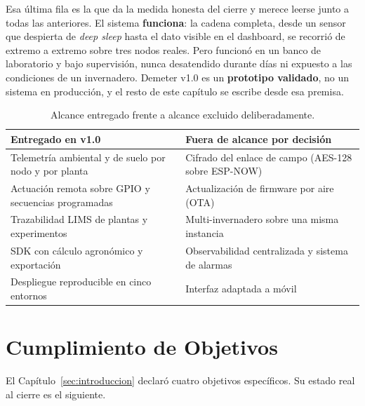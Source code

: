 Esa última fila es la que da la medida honesta del cierre y merece leerse junto a
todas las anteriores. El sistema \textbf{funciona}: la cadena completa, desde un
sensor que despierta de \textit{deep sleep} hasta el dato visible en el dashboard,
se recorrió de extremo a extremo sobre tres nodos reales. Pero funcionó en un banco
de laboratorio y bajo supervisión, nunca desatendido durante días ni expuesto a las
condiciones de un invernadero. Demeter v1.0 es un \textbf{prototipo validado}, no un
sistema en producción, y el resto de este capítulo se escribe desde esa premisa.

\begin{table}[H]
    \centering
    \caption{Alcance entregado frente a alcance excluido deliberadamente.}
    \label{tab:alcance_v1}
    \begin{tabular}{p{6.2cm}p{6.2cm}}
        \toprule
        \textbf{Entregado en v1.0} & \textbf{Fuera de alcance por decisión} \\
        \midrule
        Telemetría ambiental y de suelo por nodo y por planta &
        Cifrado del enlace de campo (AES-128 sobre ESP-NOW) \\
        Actuación remota sobre GPIO y secuencias programadas &
        Actualización de firmware por aire (OTA) \\
        Trazabilidad LIMS de plantas y experimentos &
        Multi-invernadero sobre una misma instancia \\
        SDK con cálculo agronómico y exportación &
        Observabilidad centralizada y sistema de alarmas \\
        Despliegue reproducible en cinco entornos &
        Interfaz adaptada a móvil \\
        \bottomrule
    \end{tabular}
\end{table}

\section{Cumplimiento de Objetivos}

El Capítulo~\ref{sec:introduccion} declaró cuatro objetivos específicos. Su estado
real al cierre es el siguiente.

